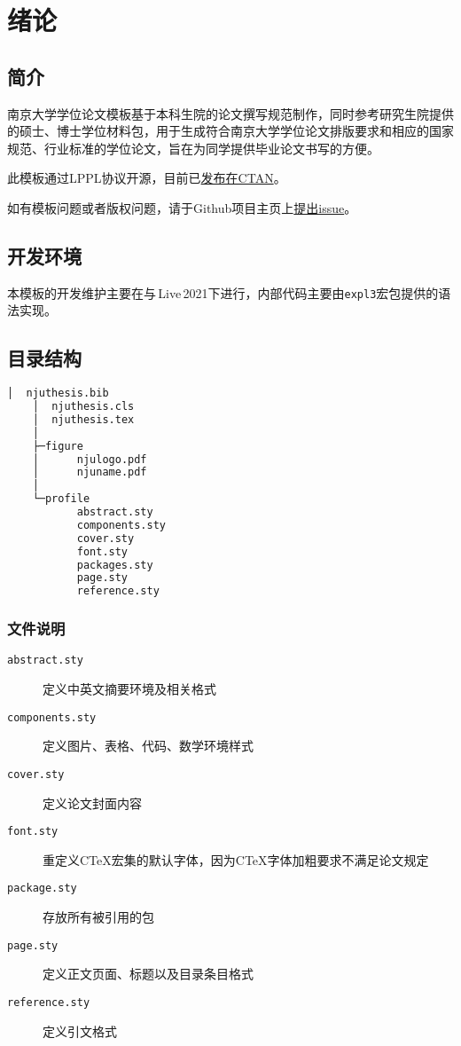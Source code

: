 \chapter{绪论}

\section{简介}
南京大学学位论文模板\cite{njuthesis}基于本科生院的论文撰写规范制作，同时参考研究生院提供的硕士、博士学位材料包，用于生成符合南京大学学位论文排版要求和相应的国家规范、行业标准的学位论文，旨在为同学提供毕业论文书写的方便。

此模板通过LPPL协议开源，目前已\href{https://ctan.org/pkg/njuthesis}{发布在CTAN}。

如有模板问题或者版权问题，请于Github项目主页上\href{https://github.com/nju-lug/NJUThesis/issues}{提出issue}。

\section{开发环境}

本模板的开发维护主要在与\,Live\,2021下进行，内部代码主要由\lstinline|expl3|宏包提供的语法实现。

\section{目录结构}
\label{sec:directory}

\begin{lstlisting}[language=bash]
    │  njuthesis.bib
    │  njuthesis.cls
    │  njuthesis.tex
    │
    ├─figure
    │      njulogo.pdf
    │      njuname.pdf
    │
    └─profile
           abstract.sty
           components.sty
           cover.sty
           font.sty
           packages.sty
           page.sty
           reference.sty
\end{lstlisting}

\subsection{文件说明}
\begin{description}
    \item [\texttt{abstract.sty}] 定义中英文摘要环境及相关格式
    \item [\texttt{components.sty}] 定义图片、表格、代码、数学环境样式
    \item [\texttt{cover.sty}] 定义论文封面内容
    \item [\texttt{font.sty}] 重定义CTeX宏集的默认字体，因为CTeX字体加粗要求不满足论文规定
    \item [\texttt{package.sty}] 存放所有被引用的包
    \item [\texttt{page.sty}] 定义正文页面、标题以及目录条目格式
    \item [\texttt{reference.sty}] 定义引文格式
\end{description}

